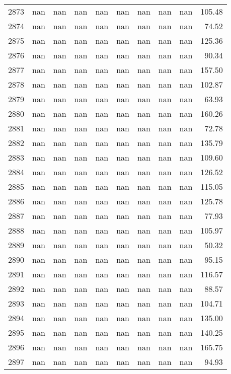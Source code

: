\begin{tabular}{lrrrrrrrrr}
2873 & nan & nan & nan & nan & nan & nan & nan & nan & 105.48 \\
2874 & nan & nan & nan & nan & nan & nan & nan & nan & 74.52 \\
2875 & nan & nan & nan & nan & nan & nan & nan & nan & 125.36 \\
2876 & nan & nan & nan & nan & nan & nan & nan & nan & 90.34 \\
2877 & nan & nan & nan & nan & nan & nan & nan & nan & 157.50 \\
2878 & nan & nan & nan & nan & nan & nan & nan & nan & 102.87 \\
2879 & nan & nan & nan & nan & nan & nan & nan & nan & 63.93 \\
2880 & nan & nan & nan & nan & nan & nan & nan & nan & 160.26 \\
2881 & nan & nan & nan & nan & nan & nan & nan & nan & 72.78 \\
2882 & nan & nan & nan & nan & nan & nan & nan & nan & 135.79 \\
2883 & nan & nan & nan & nan & nan & nan & nan & nan & 109.60 \\
2884 & nan & nan & nan & nan & nan & nan & nan & nan & 126.52 \\
2885 & nan & nan & nan & nan & nan & nan & nan & nan & 115.05 \\
2886 & nan & nan & nan & nan & nan & nan & nan & nan & 125.78 \\
2887 & nan & nan & nan & nan & nan & nan & nan & nan & 77.93 \\
2888 & nan & nan & nan & nan & nan & nan & nan & nan & 105.97 \\
2889 & nan & nan & nan & nan & nan & nan & nan & nan & 50.32 \\
2890 & nan & nan & nan & nan & nan & nan & nan & nan & 95.15 \\
2891 & nan & nan & nan & nan & nan & nan & nan & nan & 116.57 \\
2892 & nan & nan & nan & nan & nan & nan & nan & nan & 88.57 \\
2893 & nan & nan & nan & nan & nan & nan & nan & nan & 104.71 \\
2894 & nan & nan & nan & nan & nan & nan & nan & nan & 135.00 \\
2895 & nan & nan & nan & nan & nan & nan & nan & nan & 140.25 \\
2896 & nan & nan & nan & nan & nan & nan & nan & nan & 165.75 \\
2897 & nan & nan & nan & nan & nan & nan & nan & nan & 94.93 \\

\end{tabular}
